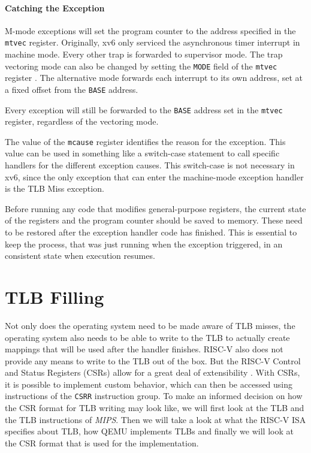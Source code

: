 \paragraph{Catching the Exception} M-mode exceptions will set the program counter to the address
specified in the \texttt{mtvec} register. Originally, xv6 only serviced the asynchronous
timer interrupt in machine mode. Every other trap is forwarded to supervisor mode.
The trap vectoring mode can also be changed by setting the \texttt{MODE} field of the
\texttt{mtvec} register \cite{RISCVInstructionSet}. The alternative mode forwards
each interrupt to its own address, set at a fixed offset from the \texttt{BASE} address.

Every exception will still be forwarded to the \texttt{BASE} address set in the \texttt{mtvec}
register, regardless of the vectoring mode.

The value of the \texttt{mcause} register identifies the reason for the exception.
This value can be used in something like a switch-case statement to call specific handlers
for the different exception causes.
This switch-case is not necessary in xv6, since the only exception that can enter
the machine-mode exception handler is the TLB Miss exception.

Before running any code that modifies general-purpose registers, the current state of the
registers and the program counter should be saved to memory. These need to be restored after
the exception handler code has finished.
This is essential to keep the process, that was just running when the exception triggered,
in an consistent state when execution resumes.


\section{TLB Filling}
Not only does the operating system need to be made aware of TLB misses,
the operating system also needs to be able to write to the TLB to actually create
mappings that will be used after the handler finishes.
RISC-V also does not provide any means to write to the TLB out of the box. But the RISC-V Control and Status Registers
(CSRs) allow for a great deal of extensibility \cite{riscvreader}.
With CSRs, it is possible to implement custom behavior, which can then be accessed using instructions
of the \texttt{CSRR} instruction group.
To make an informed decision on how the CSR format for TLB writing may look like, we will first
look at the TLB and the TLB instructions of \emph{MIPS}. Then we will take a look at what the
RISC-V ISA specifies about TLB, how QEMU implements TLBs and finally we will look at the
CSR format that is used for the implementation.


